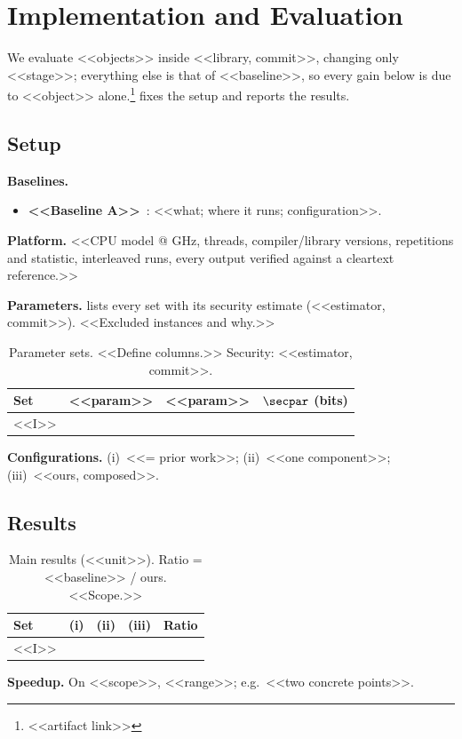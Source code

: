 \section{Implementation and Evaluation}\label{sec:eval}
We evaluate <<objects>> inside <<library, commit>>, changing only <<stage>>; everything
else is that of <<baseline>>, so every gain below is due to <<object>> alone.\footnote{<<artifact link>>}
 fixes the setup and  reports the results.

\subsection{Setup}\label{sec:eval:setup}
\noindent\textbf{Baselines.}
\begin{itemize}
\item \textbf{<<Baseline A>>}~\cite{Gro16}: <<what; where it runs; configuration>>.
\end{itemize}
\noindent\textbf{Platform.} <<CPU model @ GHz, threads, compiler/library versions, repetitions
and statistic, interleaved runs, every output verified against a cleartext reference.>>

\noindent\textbf{Parameters.}  lists every set with its security estimate
(<<estimator, commit>>). <<Excluded instances and why.>>
\begin{table}[t]\centering\scriptsize
\caption{Parameter sets. <<Define columns.>> Security: <<estimator, commit>>.}\label{tab:params}
\begin{tabular}{lccc}\toprule Set & <<param>> & <<param>> & $\secpar$ (bits)\\\midrule <<I>> & & & \\\bottomrule\end{tabular}
\end{table}

\noindent\textbf{Configurations.} (i)~<<= prior work>>; (ii)~<<one component>>; (iii)~<<ours, composed>>.

\subsection{Results}\label{sec:eval:results}
\begin{table}[t]\centering\scriptsize
\caption{Main results (<<unit>>). Ratio = <<baseline>> / ours. <<Scope.>>}\label{tab:main}
\begin{tabular}{lcccc}\toprule Set & (i) & (ii) & (iii) & Ratio\\\midrule <<I>> & & & & \\\bottomrule\end{tabular}
\end{table}
\noindent\textbf{Speedup.} On <<scope>>, <<range>>; e.g.\ <<two concrete points>>.

